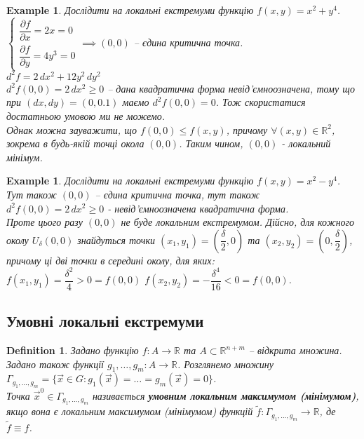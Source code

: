 \documentclass[a4paper, 10pt]{article}
\def\departial#1#2{\dfrac{\partial {#1}}{\partial {#2}}}
\theoremstyle{theoremdd}
\theoremstyle{theoremdd}
\theoremstyle{theoremdd}
\newtheorem{definition}[theorem]{Definition}
\theoremstyle{theoremdd}
\theoremstyle{theoremdd}
\newtheorem{example}[theorem]{Example}
\theoremstyle{theoremdd}
\theoremstyle{theoremdd}
\theoremstyle{theoremdd}
\theoremstyle{theoremdd}
\begin{document}
\begin{example}
Дослідити на локальні екстремуми функцію $f(x,y) = x^2+y^4$.\\
$\begin{cases} \departial{f}{x} = 2x = 0 \\ \departial{f}{y} = 4y^3 = 0 \end{cases} \implies (0,0)$ -- єдина критична точка.\\
$d^2 f = 2\,dx^2 + 12y^2\,dy^2$\\
$d^2 f(0,0) = 2\,dx^2 \geq 0$ -- дана квадратична форма невід'ємноозначена, тому що при $(dx,dy) = (0,0.1)$ маємо $d^2 f(0,0) = 0$. Тож скористатися достатньою умовою ми не можемо.\\
Однак можна зауважити, що $f(0,0) \leq f(x,y)$, причому $\forall (x,y) \in \mathbb{R}^2$, зокрема в будь-якій точці окола $(0,0)$. Таким чином, $(0,0)$ - локальний мінімум.
\end{example}

\begin{example}
Дослідити на локальні екстремуми функцію $f(x,y) = x^2-y^4$.\\
Тут також $(0,0)$ -- єдина критична точка, тут також $d^2 f(0,0) = 2\,dx^2 \geq 0$ - невід'ємноозначена квадратична форма.\\
Проте цього разу $(0,0)$ не буде локальним екстремумом. Дійсно, для кожного околу $U_\delta (0,0)$ знайдуться точки $(x_1,y_1) = \left(\dfrac{\delta}{2}, 0 \right)$ та $(x_2,y_2) = \left(0, \dfrac{\delta}{2} \right)$, причому ці дві точки в середині околу, для яких:\\
$f(x_1,y_1) = \dfrac{\delta^2}{4} > 0 = f(0,0)$ \hspace{2cm} $f(x_2,y_2) = - \dfrac{\delta^4}{16} < 0 = f(0,0)$.
\end{example}

\subsection{Умовні локальні екстремуми}
\begin{definition}
Задано функцію $f\colon A \to \mathbb{R}$ та $A \subset \mathbb{R}^{n+m}$ -- відкрита множина. Задано також функції $g_1,\dots,g_m \colon A \to \mathbb{R}$. Розглянемо множину $\Gamma_{g_1,\dots,g_m} = \{ \vec{x} \in G: g_1(\vec{x}) = \dots = g_m(\vec{x}) = 0 \}$.\\
Точка $\vec{x}^0 \in \Gamma_{g_1,\dots,g_m}$ називається \textbf{умовним локальним максимумом (мінімумом)}, якщо вона є локальним максимумом (мінімумом) функцій $\tilde{f} \colon \Gamma_{g_1,\dots,g_m} \to \mathbb{R}$, де $\tilde{f} \equiv f$.
\end{definition}
\end{document}

